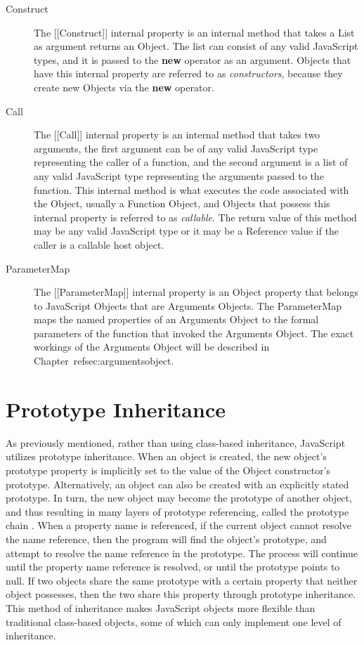 \documentclass[a4paper,11pt,twoside]{report}
\begin{document}
\begin{description}
\item[Construct]
The [[Construct]] internal property is an internal method that takes a List as argument returns an Object. The list can consist of any valid JavaScript types, and it is passed to the \textbf{new} operator as an argument. Objects that have this internal property are referred to as \textit{constructors}, because they create new Objects via the \textbf{new} operator.

\item[Call]
The [[Call]] internal property is an internal method that takes two arguments, the first argument can be of any valid JavaScript type representing the caller of a function, and the second argument is a list of any valid JavaScript type representing the arguments passed to the function. This internal method is what executes the code associated with the Object, usually a Function Object, and Objects that possess this internal property is referred to as \textit{callable}. The return value of this method may be any valid JavaScript type or it may be a Reference value if the caller is a callable host object.

\item[ParameterMap]
The [[ParameterMap]] internal property is an Object property that belongs to JavaScript Objects that are Arguments Objects. The ParameterMap maps the named properties of an Arguments Object to the formal parameters of the function that invoked the Arguments Object. The exact workings of the Arguments Object will be described in Chapter~ref{sec:argumentsobject}.
\end{description}

\section{Prototype Inheritance}
As previously mentioned, rather than using class-based inheritance, JavaScript utilizes prototype inheritance. When an object is created, the new object's prototype property is implicitly set to the value of the Object constructor's prototype. Alternatively, an object can also be created with an explicitly stated prototype. In turn, the new object may become the prototype of another object, and thus resulting in many layers of prototype referencing, called the prototype chain \cite{EcmaScript}. When a property name is referenced, if the current object cannot resolve the name reference, then the program will find the object's prototype, and attempt to resolve the name reference in the prototype. The process will continue until the property name reference is resolved, or until the prototype points to null. If two objects share the same prototype with a certain property that neither object possesses, then the two share this property through prototype inheritance. This method of inheritance makes JavaScript objects more flexible than traditional class-based objects, some of which can only implement one level of inheritance.
\end{document}
